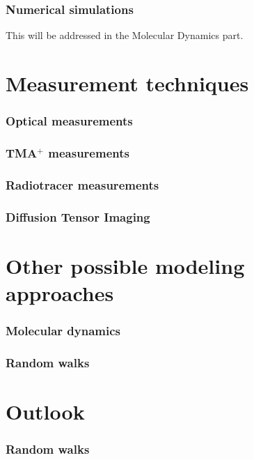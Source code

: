 \documentclass{beamer}
\begin{document}
 \begin{frame}
  \frametitle{Numerical simulations}
  This will be addressed in the Molecular Dynamics part.
 \end{frame}


\section{Measurement techniques}
 \begin{frame}
 \frametitle{Optical measurements}
 
\end{frame}

 \begin{frame}
 \frametitle{TMA$^+$ measurements}
\end{frame}

 \begin{frame}
 \frametitle{Radiotracer measurements}
\end{frame}

 \begin{frame}
 \frametitle{Diffusion Tensor Imaging}
\end{frame}

\section{Other possible modeling approaches}
\begin{frame}
 \frametitle{Molecular dynamics}
\end{frame}

\begin{frame}
 \frametitle{Random walks}
\end{frame}

\section{Outlook}
\begin{frame}
 \frametitle{Random walks}
\end{frame}

\begin{frame}
\end{frame}
\end{document}
